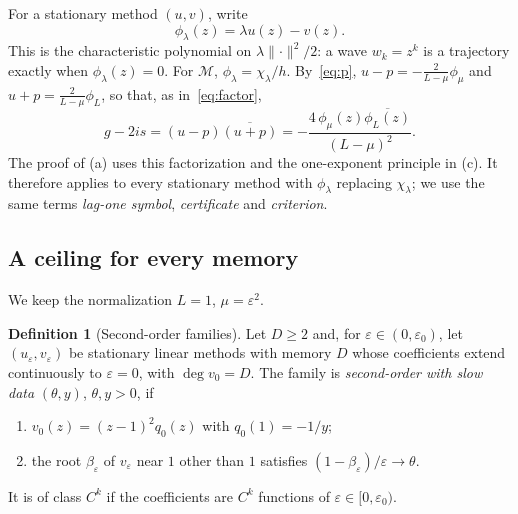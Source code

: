 \documentclass[11pt]{article}
\theoremstyle{definition}
\newtheorem{definition}[theorem]{Definition}
\theoremstyle{remark}
\newcommand{\cM}{\mathcal M}
\newcommand{\norm}[1]{\lVert #1\rVert}
\begin{document}
For a stationary method \((u,v)\), write
\[
\phi_\lambda(z)=\lambda u(z)-v(z).
\]
This is the characteristic polynomial on \(\lambda\norm\cdot^2/2\): a wave
\(w_k=z^k\) is a trajectory exactly when \(\phi_\lambda(z)=0\).
For \(\cM\), \(\phi_\lambda=\chi_\lambda/h\).  By~\eqref{eq:p},
\(u-p=-\frac2{L-\mu}\phi_\mu\) and \(u+p=\frac2{L-\mu}\phi_L\), so that, as in~\eqref{eq:factor},
\begin{equation}\label{eq:factorgen}
g-2is=(u-p)\overline{(u+p)}=-\frac{4\,\phi_\mu(z)\overline{\phi_L(z)}}{(L-\mu)^2}.
\end{equation}
The proof of (a) uses this factorization and the one-exponent
principle in (c).  It therefore applies to every stationary method
with \(\phi_\lambda\) replacing \(\chi_\lambda\); we use the same terms
\emph{lag-one symbol}, \emph{certificate} and \emph{criterion}.

\subsection{A ceiling for every memory}
\label{sec:ceiling}

We keep the normalization \(L=1\), \(\mu=\varepsilon^2\).

\begin{definition}[Second-order families]\label{def:second}
Let \(D\ge2\) and, for \(\varepsilon\in(0,\varepsilon_0)\), let \((u_\varepsilon,v_\varepsilon)\) be stationary linear methods
with memory \(D\) whose coefficients extend continuously to \(\varepsilon=0\), with \(\deg v_0=D\).
The family is \emph{second-order with slow data} \((\theta,y)\), \(\theta,y>0\), if
\begin{enumerate}[label=\textup{(\roman*)}]
\item \(v_0(z)=(z-1)^2q_0(z)\) with \(q_0(1)=-1/y\);
\item the root \(\beta_\varepsilon\) of \(v_\varepsilon\) near \(1\) other than \(1\) satisfies \((1-\beta_\varepsilon)/\varepsilon\to\theta\).
\end{enumerate}
It is of class \(C^k\) if the coefficients are \(C^k\) functions of \(\varepsilon\in[0,\varepsilon_0)\).
\end{definition}
\end{document}
